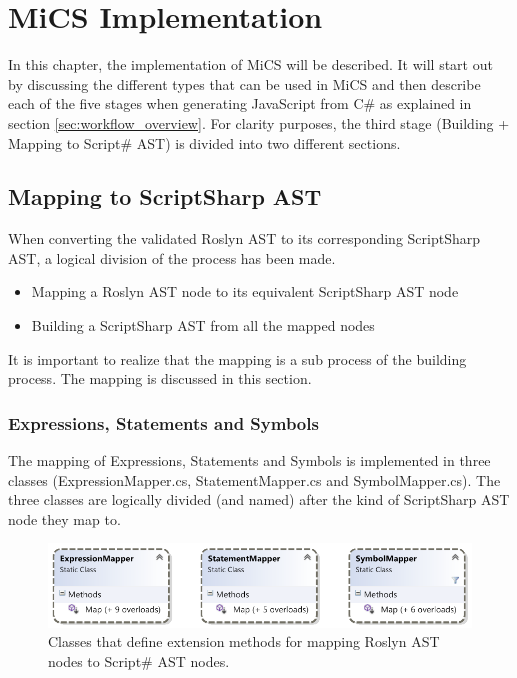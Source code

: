\chapter{MiCS Implementation}
	In this chapter, the implementation of MiCS will be described. It will start out by discussing the different types that can be used in MiCS and then describe each of the five stages when generating JavaScript from C\# as explained in section \ref{sec:workflow_overview}. For clarity purposes, the third stage (Building + Mapping to Script\# AST) is divided into two different sections.






\section{Mapping to ScriptSharp AST} %
\label{sec:mapping_to_scriptsharp_ast}
	When converting the validated Roslyn AST to its corresponding ScriptSharp AST, a logical division of the process has been made. 

	\begin{itemize}
		\item Mapping a Roslyn AST node to its equivalent ScriptSharp AST node
		\item Building a ScriptSharp AST from all the mapped nodes
	\end{itemize}

	It is important to realize that the mapping is a sub process of the building process. The mapping is discussed in this section. 

	\subsection{Expressions, Statements and Symbols} %
	\label{sub:subsection_mapping_to_scriptsharp_expressions_statements_and_symbols}
		The mapping of Expressions, Statements and Symbols is implemented in three classes (ExpressionMapper.cs, StatementMapper.cs and SymbolMapper.cs). The three classes are logically divided (and named) after the kind of ScriptSharp AST node they map to. 

		\begin{figure}[H]
			\begin{center}
				\centerline{\includegraphics[width=14cm]{resources/images/MapperClasses.png}}
			\end{center}
			\caption{Classes that define extension methods for mapping Roslyn AST nodes to Script\# AST nodes.}
			\label{mapperClasses}
		\end{figure}

